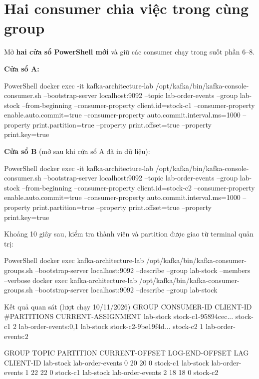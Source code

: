 \section{Hai consumer chia việc trong cùng group}

Mở \textbf{hai cửa sổ PowerShell mới} và giữ các consumer chạy trong suốt phần 6--8.


\textbf{Cửa sổ A:}\par\nopagebreak

\begin{aivncodebox}[language={}]{PowerShell}
docker exec -it kafka-architecture-lab /opt/kafka/bin/kafka-console-consumer.sh --bootstrap-server localhost:9092 --topic lab-order-events --group lab-stock --from-beginning --consumer-property client.id=stock-c1 --consumer-property enable.auto.commit=true --consumer-property auto.commit.interval.ms=1000 --property print.partition=true --property print.offset=true --property print.key=true
\end{aivncodebox}

\textbf{Cửa sổ B} (mở sau khi cửa sổ A đã in dữ liệu):\par\nopagebreak

\begin{aivncodebox}[language={}]{PowerShell}
docker exec -it kafka-architecture-lab /opt/kafka/bin/kafka-console-consumer.sh --bootstrap-server localhost:9092 --topic lab-order-events --group lab-stock --from-beginning --consumer-property client.id=stock-c2 --consumer-property enable.auto.commit=true --consumer-property auto.commit.interval.ms=1000 --property print.partition=true --property print.offset=true --property print.key=true
\end{aivncodebox}

Khoảng 10 giây sau, kiểm tra thành viên và partition được giao từ terminal quản trị:


\begin{aivncodebox}[language={}]{PowerShell}
docker exec kafka-architecture-lab /opt/kafka/bin/kafka-consumer-groups.sh --bootstrap-server localhost:9092 --describe --group lab-stock --members --verbose
docker exec kafka-architecture-lab /opt/kafka/bin/kafka-consumer-groups.sh --bootstrap-server localhost:9092 --describe --group lab-stock
\end{aivncodebox}

\begin{aivnCodeOutput}{Kết quả quan sát (lượt chạy 10/11/2026)}
GROUP      CONSUMER-ID          CLIENT-ID  #PARTITIONS  CURRENT-ASSIGNMENT
lab-stock  stock-c1-95894cec... stock-c1   2            lab-order-events:0,1
lab-stock  stock-c2-9be19f4d... stock-c2   1            lab-order-events:2

GROUP      TOPIC             PARTITION  CURRENT-OFFSET  LOG-END-OFFSET  LAG  CLIENT-ID
lab-stock  lab-order-events  0          20              20              0    stock-c1
lab-stock  lab-order-events  1          22              22              0    stock-c1
lab-stock  lab-order-events  2          18              18              0    stock-c2
\end{aivnCodeOutput}


